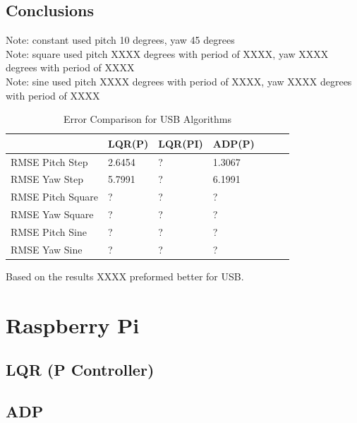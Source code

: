 \subsection{Conclusions}
Note: constant used pitch 10 degrees, yaw 45 degrees\\
Note: square used pitch XXXX degrees with period of XXXX, yaw XXXX degrees with period of XXXX\\
Note: sine used pitch XXXX degrees with period of XXXX, yaw XXXX degrees with period of XXXX\\
\begin{table}[h!]
    \centering
    \begin{tabular}{l|l|l|l|l|l|l}
        \toprule
        \textbf{} & \textbf{LQR(P)} & \textbf{LQR(PI)} &
        \textbf{ADP(P)} \\
        \toprule
        RMSE Pitch Step & 2.6454 & ? & 1.3067 \\
        RMSE Yaw Step & 5.7991 & ? & 6.1991 \\
        RMSE Pitch Square & ? & ? & ? \\
        RMSE Yaw Square & ? & ? & ? \\
        RMSE Pitch Sine & ? & ? & ? \\
        RMSE Yaw Sine & ? & ? & ? \\
        \bottomrule
    \end{tabular}
    \caption{Error Comparison for USB Algorithms}
    \label{tab:USB_RMSE}
\end{table}
Based on the results XXXX preformed better for USB.

\section{Raspberry Pi}

\subsection{LQR (P Controller)}

\subsection{ADP}

